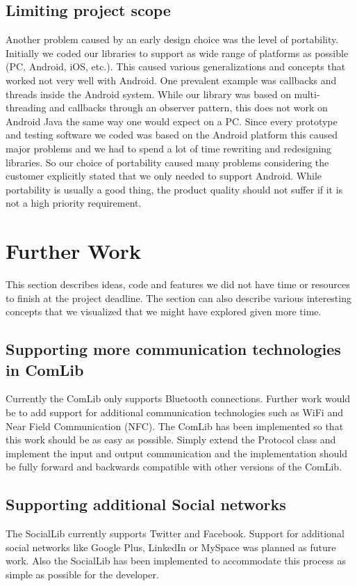 \subsection{Limiting project scope}
Another problem caused by an early design choice was the level of portability. Initially we coded our libraries to support as wide range of platforms as possible (PC, Android, iOS, etc.). This caused various generalizations and concepts that worked not very well with Android. One prevalent example was callbacks and threads inside the Android system. While our library was based on multi-threading and callbacks through an observer pattern, this does not work on Android Java the same way one would expect on a PC. Since every prototype and testing software we coded was based on the Android platform this caused major problems and we had to spend a lot of time rewriting and redesigning libraries. So our choice of portability caused many problems considering the customer explicitly stated that we only needed to support Android. While portability is usually a good thing, the product quality should not suffer if it is not a high priority requirement.

\section{Further Work}
This section describes ideas, code and features we did not have time or resources to
finish at the project deadline. The section can also describe various interesting concepts 
that we visualized that we might have explored given more time.

\subsection{Supporting more communication technologies in ComLib}
Currently the ComLib only supports Bluetooth connections. Further work would be
to add support for additional communication technologies such as WiFi and Near Field 
Communication (NFC). The ComLib has been implemented so that this work should
be as easy as possible. Simply extend the Protocol class and implement the input and
output communication and the implementation should be fully forward and backwards
compatible with other versions of the ComLib.

\subsection{Supporting additional Social networks}
The SocialLib currently supports Twitter and Facebook. Support for additional social
networks like Google Plus, LinkedIn or MySpace was planned as future work. Also the
SocialLib has been implemented to accommodate this process as simple as possible
for the developer.

